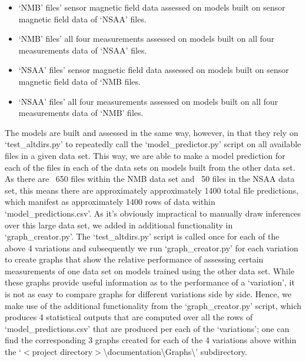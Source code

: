 \documentclass[12pt,twoside]{report}
\begin{document}
\begin{itemize}
	\item ‘NMB’ files’ sensor magnetic field data assessed on models built on sensor magnetic field data of ‘NSAA’ files.
	\item ‘NMB’ files’ all four measurements assessed on models built on all four measurements data of ‘NSAA’ files.
	\item ‘NSAA’ files’ sensor magnetic field data assessed on models built on sensor magnetic field data of ‘NMB files.
	\item ‘NSAA’ files’ all four measurements assessed on models built on all four measurements data of ‘NMB’ files.
\end{itemize}

\quad The models are built and assessed in the same way, however, in that they rely on ‘test\_altdirs.py’ to repeatedly call the ‘model\_predictor.py’ script on all available files in a given data set. This way, we are able to make a model prediction for each of the files in each of the data sets on models built from the other data set. As there are ~650 files within the NMB data set and ~50 files in the NSAA data set, this means there are approximately approximately 1400 total file predictions, which manifest as  approximately 1400 rows of data within ‘model\_predictions.csv’. As it’s obviously impractical to manually draw inferences over this large data set, we added in additional functionality in ‘graph\_creator.py’. The ‘test\_altdirs.py’ script is called once for each of the above 4 variations and subsequently we run ‘graph\_creator.py’ for each variation to create graphs that show the relative performance of assessing certain measurements of one data set on models trained using the other data set. While these graphs provide useful information as to the performance of a ‘variation’, it is not as easy to compare graphs for different variations side by side. Hence, we make use of the additional functionality from the ‘graph\_creator.py’ script, which produces 4 statistical outputs that are computed over all the rows of ‘model\_predictions.csv’ that are produced per each of the ‘variations’; one can find the corresponding 3 graphs created for each of the 4 variations above within the ‘$<$project directory$>$\textbackslash documentation\textbackslash Graphs\textbackslash ’ subdirectory.\\
\end{document}
